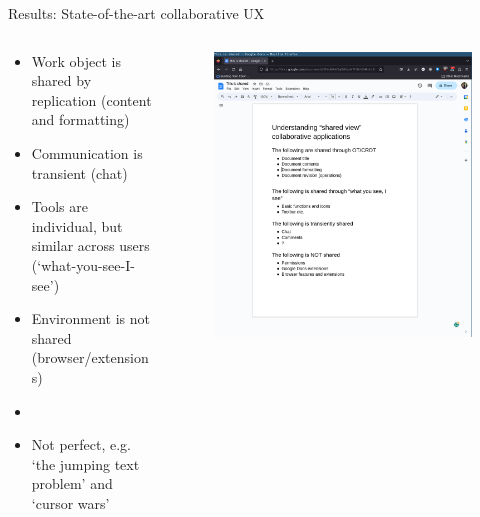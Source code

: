 \documentclass[aspectratio=169]{beamer}
\begin{document}
\begin{frame}{Results: State-of-the-art collaborative UX}
    \begin{columns}
        \begin{column}{0.6\textwidth}
            \begin{itemize}
                \small
                \item Work object is shared by replication (content and formatting)
                \item Communication is transient (chat)
                \item Tools are individual, but similar across users (`what-you-see-I-see')
                \item Environment is not shared (browser/extensions)
                \item[]
                \item Not perfect, e.g. `the jumping text problem' and `cursor wars'
            \end{itemize}
        \end{column}
        \begin{column}{0.4\textwidth}
            \begin{figure}[h]
                \centering
                \includegraphics[width=1\textwidth]{images/gdocs.png}
            \end{figure}
        \end{column}
    \end{columns}
\end{frame}
\end{document}
